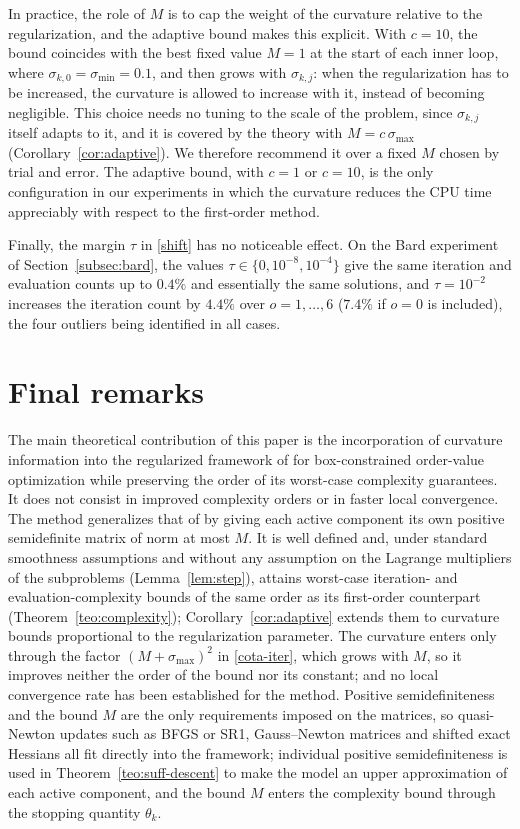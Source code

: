 \documentclass[11pt]{article}
\begin{document}
In practice, the role of $M$ is to cap the weight of the curvature relative to
the regularization, and the adaptive bound makes this explicit. With
$c = 10$, the bound coincides with the best fixed value $M = 1$ at the start of
each inner loop, where $\sigma_{k,0} = \sigma_{\min} = 0.1$, and then grows
with $\sigma_{k,j}$: when the regularization has to be increased, the
curvature is allowed to increase with it, instead of becoming negligible. This
choice needs no tuning to the scale of the problem, since $\sigma_{k,j}$ itself
adapts to it, and it is covered by the theory with $M = c\,\sigma_{\max}$
(Corollary~\ref{cor:adaptive}). We therefore recommend it over a fixed $M$ chosen by
trial and error. The adaptive bound, with $c = 1$ or $c = 10$, is the only
configuration in our experiments in which the curvature reduces the CPU time
appreciably with respect to the first-order method.

Finally, the margin $\tau$ in \eqref{shift} has no noticeable effect. On the
Bard experiment of Section~\ref{subsec:bard}, the values
$\tau \in \{0, 10^{-8}, 10^{-4}\}$ give the same iteration and evaluation counts
up to $0.4\%$ and essentially the same solutions, and $\tau = 10^{-2}$
increases the iteration count by $4.4\%$ over $o = 1, \dots, 6$ ($7.4\%$ if
$o = 0$ is included), the four outliers being identified in all cases.


\section{Final remarks} \label{sec:final}

The main theoretical contribution of this paper is the incorporation of
curvature information into the regularized framework of \cite{alvarezovo} for
box-constrained order-value optimization while preserving the order of its
worst-case complexity guarantees. It does not consist in improved complexity
orders or in faster local convergence. The method generalizes that of
\cite{alvarezovo} by giving each active component its own positive
semidefinite matrix of norm at most $M$. It is well defined and, under standard
smoothness assumptions and without any assumption on the Lagrange multipliers
of the subproblems (Lemma~\ref{lem:step}), attains worst-case iteration- and
evaluation-complexity bounds of the same order as its first-order counterpart
(Theorem~\ref{teo:complexity}); Corollary~\ref{cor:adaptive} extends them to
curvature bounds proportional to the regularization parameter. The curvature
enters only through the factor $(M + \sigma_{\max})^2$ in \eqref{cota-iter},
which grows with $M$, so it improves neither the order of the bound nor its
constant; and no local convergence rate has been established for the method.
Positive semidefiniteness and the bound $M$ are the only
requirements imposed on the matrices, so quasi-Newton updates such as BFGS or
SR1, Gauss--Newton matrices and shifted exact Hessians all fit directly into the
framework; individual positive semidefiniteness is used in
Theorem~\ref{teo:suff-descent} to make the model an upper approximation of each
active component, and the bound $M$ enters the complexity bound through the
stopping quantity $\theta_k$.
\end{document}
